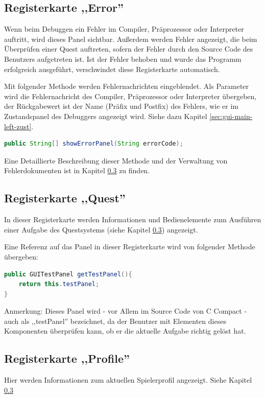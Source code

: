 \subsection{Registerkarte ,,Error''}
Wenn beim Debuggen ein Fehler im Compiler, Präprozessor oder Interpreter auftritt, wird dieses Panel sichtbar. Außerdem werden Fehler angezeigt, die beim Überprüfen einer Quest auftreten, sofern der Fehler durch den Source Code des Benutzers aufgetreten ist. Ist der Fehler behoben und wurde das Programm erfolgreich ausgeführt, verschwindet diese Registerkarte automatisch.

Mit folgender Methode werden Fehlernachrichten eingeblendet. Als Parameter wird die Fehlernachricht des Compiler, Präprozessor oder Interpreter übergeben, der Rückgabewert ist der Name (Präfix und Postfix) des Fehlers, wie er im Zustandspanel des Debuggers angezeigt wird. Siehe dazu Kapitel \ref{sec:gui-main-left-zust}.
\begin{lstlisting}[language=JAVA]
public String[] showErrorPanel(String errorCode);
\end{lstlisting}

Eine Detaillierte Beschreibung dieser Methode und der Verwaltung von Fehlerdokumenten ist in Kapitel \ref{} zu finden.

\subsection{Registerkarte ,,Quest''}
In dieser Registerkarte werden Informationen und Bedienelemente zum Ausführen einer Aufgabe des Questsystems (siehe Kapitel \ref{}) angezeigt.

Eine Referenz auf das Panel in dieser Registerkarte wird von folgender Methode übergeben:
\begin{lstlisting}[language=JAVA]
public GUITestPanel getTestPanel(){
	return this.testPanel;
}
\end{lstlisting}

Anmerkung: Dieses Panel wird - vor Allem im Source Code von C Compact - auch als ,,testPanel'' bezeichnet, da der Benutzer mit Elementen dieses Komponenten überprüfen kann, ob er die aktuelle Aufgabe richtig gelöst hat.

\subsection{Registerkarte ,,Profile''}
Hier werden Informationen zum aktuellen Spielerprofil angezeigt. Siehe Kapitel \ref{}


